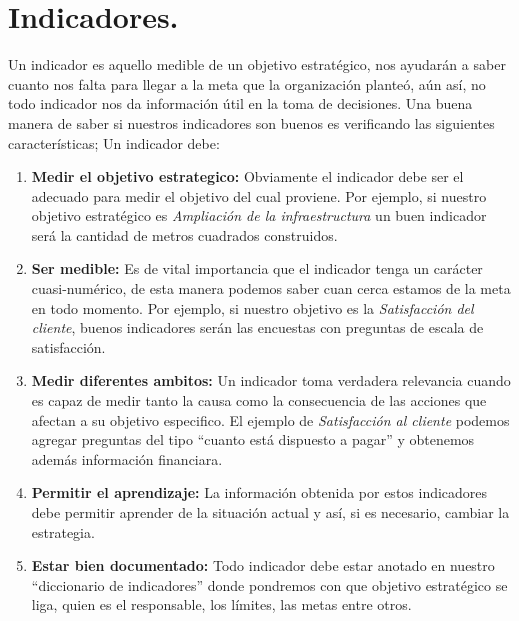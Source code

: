 \documentclass[spanish, fleqn]{article}
\begin{document}
	\section{Indicadores.}
	Un indicador es aquello medible de un objetivo estratégico, nos ayudarán a
	saber cuanto nos falta para llegar a la meta que la organización planteó,
	aún así, no todo indicador nos da información útil en la toma de decisiones.
	Una buena manera de saber si nuestros indicadores son buenos es verificando
	las siguientes características; Un indicador debe:
	\begin{enumerate}
		\item
			\textbf{Medir el objetivo estrategico:} Obviamente el indicador debe
			ser el adecuado para medir el objetivo del cual proviene. Por ejemplo,
			si nuestro objetivo estratégico es \emph{Ampliación de la
			infraestructura} un buen indicador será la cantidad de metros cuadrados
			construidos.
		\item
			\textbf{Ser medible:} Es de vital importancia que el indicador tenga
			un carácter cuasi-numérico, de esta manera podemos saber cuan cerca
			estamos de la meta en todo momento. Por ejemplo, si nuestro objetivo
			es la \emph{Satisfacción del cliente}, buenos indicadores serán las
			encuestas con preguntas de escala de satisfacción.
		\item
			\textbf{Medir diferentes ambitos:} Un indicador toma verdadera
			relevancia cuando es capaz de medir tanto la causa como la consecuencia
			de las acciones que afectan a su objetivo especifico. El ejemplo de
			\emph{Satisfacción al cliente} podemos agregar preguntas del tipo 
			``cuanto está dispuesto a pagar'' y obtenemos además información 
			financiara.
		\item
			\textbf{Permitir el aprendizaje:} La información obtenida por estos
			indicadores debe permitir aprender de la situación actual y así, si
			es necesario, cambiar la estrategia.
		\item
			\textbf{Estar bien documentado:} Todo indicador debe estar anotado en
			nuestro ``diccionario de indicadores'' donde pondremos con que objetivo
			estratégico se liga, quien es el responsable, los límites, las metas 
			entre otros.
	\end{enumerate}
	\newpage
\end{document}
